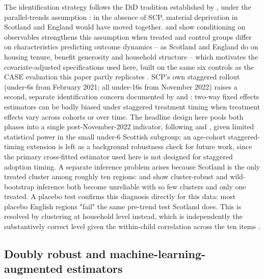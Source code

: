 The identification strategy follows the DiD tradition established by \citet{cardkrueger1994}, under the parallel-trends assumption \citep{angristpischke2009}: in the absence of SCP, material deprivation in Scotland and England would have moved together. \citet{heckmanichimuratodd1998} and \citet{abadie2005} show conditioning on observables strengthens this assumption when treated and control groups differ on characteristics predicting outcome dynamics -- as Scotland and England do on housing tenure, benefit generosity and household structure -- which motivates the covariate-adjusted specifications used here, built on the same six controls as the CASE evaluation this paper partly replicates \citep{andersen2025}. SCP's own staggered rollout (under-6s from February 2021; all under-16s from November 2022) raises a second, separate identification concern documented by \citet{goodmanbacon2021} and \citet{callawaysantanna2021}: two-way fixed effects estimators can be badly biased under staggered treatment timing when treatment effects vary across cohorts or over time. The headline design here pools both phases into a single post-November-2022 indicator, following \citet{nesom2025} and \citet{andersen2025}, given limited statistical power in the small under-6 Scottish subgroup; an age-cohort staggered-timing extension is left as a background robustness check for future work, since the primary cross-fitted estimator used here is not designed for staggered adoption timing. A separate inference problem arises because Scotland is the only treated cluster among roughly ten regions: \citet{cameronmiller2015} and \citet{mackinnonwebb2018} show cluster-robust and wild-bootstrap inference both become unreliable with so few clusters and only one treated. A placebo test confirms this diagnosis directly for this data: most placebo English regions "fail" the same pre-trend test Scotland does. This is resolved by clustering at household level instead, which is independently the substantively correct level given the within-child correlation across the ten items \citep{moulton1990}.

\subsection{Doubly robust and machine-learning-augmented estimators}
\label{sec:lit-dml}

